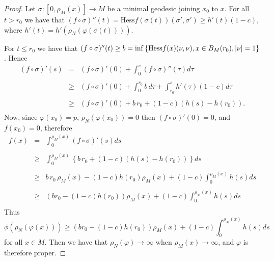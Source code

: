 \documentclass[a4paper]{amsart}
\theoremstyle{definition}
\numberwithin{equation}{section}
\begin{document}
\begin{proof}
Let $\sigma : [0,\rho_{M}(x)] \rightarrow M$ be a minimal geodesic
joining $x_0$ to $x$. For all $t > r_0 $  we have  that $(f\circ
\sigma)''(t) = {\textrm{Hess}} f(\sigma(t))(\sigma' , \sigma')\geq h'(t)(1-c)$, where $h'(t)=h'(\rho_{N}(\varphi(\sigma(t))))$.

\noindent For $t \leq r_0$ we have that $(f\circ\sigma)''(t) \geq  b
= \inf\left\{{\rm{\textrm{Hess}}} f(x)(\nu,\nu),x \in B_{M}(r_0), \vert
\nu \vert = 1\right\}$. Hence
\begin{equation}
\begin{array}{ccl}
(f\circ \sigma)'(s) &=& (f\circ \sigma)'(0) +  \int_0^s (f \circ \sigma)''(\tau)d\tau\\
\\
&\geq& (f\circ \sigma)'(0)+  \int_0^{r_0} b \,d\tau + \int_{r_0}^s h'(\tau)(1 - c) d\tau\\
\\
&\geq& (f\circ \sigma)'(0)+ b\,r_0 + (1 - c)(h(s)-h(r_{0})).\\
\end{array}
\end{equation}
Now, since $\varphi (x_0)=p$, $\rho_{N}(\varphi(x_0))=0$ then
$(f\circ \sigma)'(0) = 0$,
 and $f(x_0)=0$, therefore
\begin{equation}
\begin{array}{ccl}
f(x)&=&  \int_0^{\rho_{M}(x)} (f\circ \sigma)'(s)ds\\
\\
&\geq&  \int_0^{\rho_{M}(x)}\left \{  b\,r_0 + (1 -c)(h(s) - h(r_0))\right\}ds\\
\\
&\geq&  b\,r_0 \,\rho_{M} (x) - (1-c)h(r_0)\rho_{M}(x) + (1-c)\int_0^{\rho_{M}(x)}h(s)ds\\
\\
&\geq& ( br_0 - (1-c)h(r_0))\rho_{M}(x) + (1-c)\int_0^{\rho_{M}(x)}h(s)ds\\
\end{array}
\end{equation}
Thus
\begin{equation}
 \phi(\rho_{N}( \varphi(x)) )\geq  ( br_0 - (1-c)h(r_0))\rho_{M}(x) + (1-c)\int_0^{\rho_{M}(x)}h(s)ds\label{eqP1}
\end{equation}
for all $x \in M$. Then we have that $\rho_{N}(\varphi)\to \infty $ when  $\rho_{M}(x)\to \infty$, and $\varphi$ is therefore proper.
 

\end{proof}
\end{document}

